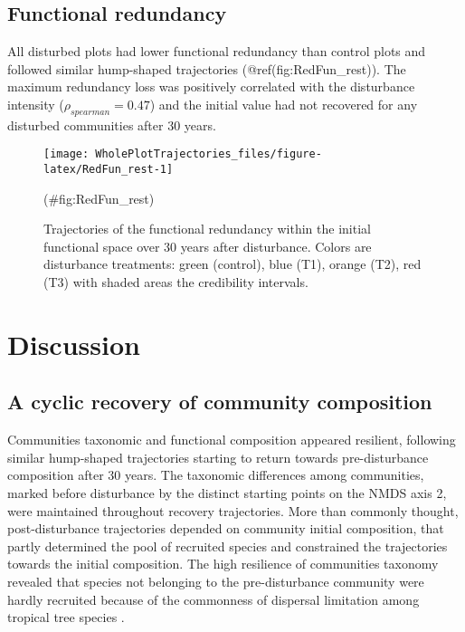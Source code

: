 \documentclass[fleqn,10pt]{ArtEcoFoG} %
\begin{document}
\subsection{Functional redundancy}\label{functional-redundancy}

All disturbed plots had lower functional redundancy than control plots
and followed similar hump-shaped trajectories (@ref(fig:RedFun\_rest)).
The maximum redundancy loss was positively correlated with the
disturbance intensity (\(\rho_{spearman}=0.47\)) and the initial value
had not recovered for any disturbed communities after 30 years.

\begin{figure}

{\centering \texttt{[image: WholePlotTrajectories\_files/figure-latex/RedFun\_rest-1]} 

}

\caption{Trajectories of the functional redundancy within the initial functional space over 30 years after disturbance. Colors are disturbance treatments: green (control), blue (T1), orange (T2), red (T3) with shaded areas the credibility intervals.}(\#fig:RedFun_rest)
\end{figure}

\section{Discussion}\label{discussion}

\subsection{A cyclic recovery of community
composition}\label{a-cyclic-recovery-of-community-composition}

Communities taxonomic and functional composition appeared resilient,
following similar hump-shaped trajectories starting to return towards
pre-disturbance composition after 30 years. The taxonomic differences
among communities, marked before disturbance by the distinct starting
points on the NMDS axis 2, were maintained throughout recovery
trajectories. More than commonly thought, post-disturbance trajectories
depended on community initial composition, that partly determined the
pool of recruited species and constrained the trajectories towards the
initial composition. The high resilience of communities taxonomy
revealed that species not belonging to the pre-disturbance community
were hardly recruited because of the commonness of dispersal limitation
among tropical tree species \citep{Svenning2005}.
\end{document}

